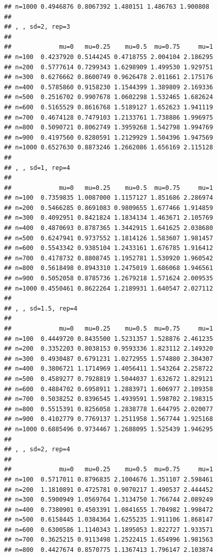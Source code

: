 \documentclass[11pt,a4paper]{article}
\begin{document}
\begin{verbatim}
## n=1000 0.4946876 0.8067392 1.480151 1.486763 1.900808
## 
## , , sd=2, rep=3
## 
##             mu=0   mu=0.25    mu=0.5  mu=0.75     mu=1
## n=100  0.4237920 0.5144245 0.4718755 2.004104 2.186295
## n=200  0.5777614 0.7299343 1.6298909 1.499530 1.929751
## n=300  0.6276662 0.8600749 0.9626478 2.011661 2.175176
## n=400  0.5785860 0.9158230 1.1544399 1.389809 2.169336
## n=500  0.2516702 0.9907678 1.0602298 1.532465 1.682624
## n=600  0.5165529 0.8616768 1.5189127 1.652623 1.941119
## n=700  0.4674128 0.7479103 1.2133761 1.738886 1.996975
## n=800  0.5090721 0.8062749 1.3959268 1.542798 1.994769
## n=900  0.4197560 0.8280591 1.2129929 1.504396 1.947569
## n=1000 0.6527630 0.8873246 1.2662086 1.656169 2.115128
## 
## , , sd=1, rep=4
## 
##             mu=0   mu=0.25    mu=0.5  mu=0.75     mu=1
## n=100  0.7359835 1.0087000 1.1157127 1.851686 2.286974
## n=200  0.5466285 0.8691083 0.9809655 1.677466 1.914859
## n=300  0.4092951 0.8421824 1.1834134 1.463671 2.105769
## n=400  0.4870693 0.8787365 1.3442915 1.641625 2.038680
## n=500  0.6247941 0.9737552 1.1814126 1.583607 1.981457
## n=600  0.5543342 0.9385104 1.2433161 1.676785 1.916412
## n=700  0.4178732 0.8808745 1.1952781 1.530920 1.960542
## n=800  0.5618498 0.8943310 1.2475019 1.686068 1.946561
## n=900  0.5052058 0.8785736 1.2679218 1.571624 2.009535
## n=1000 0.4550461 0.8622264 1.2189931 1.640547 2.027112
## 
## , , sd=1.5, rep=4
## 
##             mu=0   mu=0.25    mu=0.5  mu=0.75     mu=1
## n=100  0.4449720 0.8435500 1.5231357 1.528876 2.461235
## n=200  0.3352203 0.8038153 0.9593336 1.823112 2.149320
## n=300  0.4930487 0.6791231 1.0272955 1.574880 2.304307
## n=400  0.3806721 1.1714969 1.4056411 1.543264 2.258722
## n=500  0.4589277 0.7928819 1.5044037 1.632672 1.829121
## n=600  0.4884702 0.6958911 1.2883971 1.606977 2.109358
## n=700  0.5038252 0.8396545 1.4939591 1.598702 2.198315
## n=800  0.5515391 0.8256058 1.2838778 1.644795 2.020077
## n=900  0.4102779 0.7769137 1.2511958 1.567744 1.925168
## n=1000 0.6885496 0.9734467 1.2688095 1.525439 1.946295
## 
## , , sd=2, rep=4
## 
##             mu=0   mu=0.25    mu=0.5  mu=0.75     mu=1
## n=100  0.5717011 0.8796835 2.1004676 1.351107 2.598461
## n=200  1.1810891 0.4725781 0.9070217 1.490537 2.444452
## n=300  0.5900949 1.0569764 1.3134750 1.766744 2.089249
## n=400  0.7380901 0.4503391 1.0841655 1.704982 1.998472
## n=500  0.6158445 1.0384364 1.6255235 1.911106 1.868147
## n=600  0.6300586 1.1140343 1.1895053 1.822727 1.933571
## n=700  0.3625215 0.9113498 1.2522415 1.654996 1.981563
## n=800  0.4427674 0.8570775 1.1367413 1.796147 2.103874

\end{verbatim}
\end{document}
